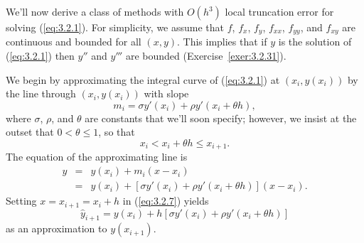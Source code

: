 \newpage
{}

\noindent
We'll now derive a class of methods with $O(h^{3})$ local truncation error for solving
(\ref{eq:3.2.1}). For simplicity, we assume that $f$, $f_{x}$, $f_{y}$, $f_{xx}$, $f_{yy}$, and
$f_{xy}$ are continuous and bounded for all $(x,y)$. This implies that if $y$ is the solution of
(\ref{eq:3.2.1}) then $y''$ and $y'''$ are bounded (Exercise~\ref{exer:3.2.31}).

We begin by approximating the integral curve of (\ref{eq:3.2.1}) at $(x_{i},y(x_{i}))$ by the line
through $(x_{i},y(x_{i}))$ with slope
\[
  m_{i}=\sigma y'(x_{i})+\rho y'(x_{i}+\theta h),
\]
where $\sigma$, $\rho$, and $\theta$ are constants that we'll soon specify; however, we insist at
the outset that $0<\theta\le1$, so that
\[
  x_{i}<x_{i}+\theta h\le x_{i+1}.
\]
The equation of the approximating line is
\begin{equation}
  \label{eq:3.2.7}
  \begin{array}{rcl}
    y & = & y(x_{i})+m_{i}(x-x_{i})                                                  \\
      & = & y(x_{i})+\left[\sigma y'(x_{i})+\rho y'(x_{i}+\theta h)\right](x-x_{i}).
  \end{array}
\end{equation}
Setting $x=x_{i+1}=x_{i}+h$ in (\ref{eq:3.2.7}) yields
\[
  \hat{y}_{i+1}=y(x_{i})+h\left[\sigma y'(x_{i})+\rho y'(x_{i}+\theta h)\right]
\]
as an approximation to $y(x_{i+1})$.

